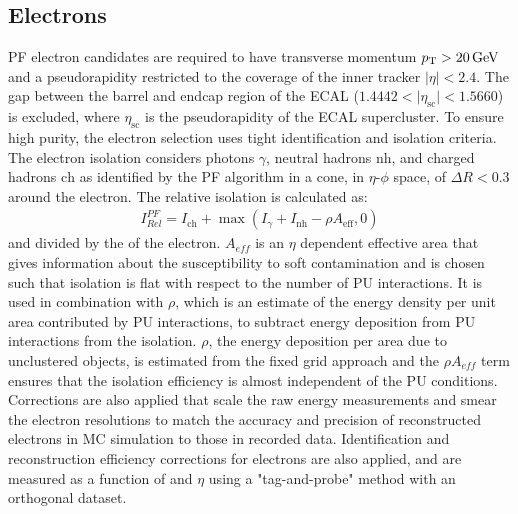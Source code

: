\subsection{Electrons}
PF electron candidates are required to have transverse momentum $\pT > \SI{20}{\GeV}$ and a pseudorapidity restricted to the coverage of the inner tracker $\vert \eta \vert < 2.4$.
The gap between the barrel and endcap region of the ECAL ($1.4442 < \vert \eta_\mathrm{sc} \vert < 1.5660$) is excluded, where $\eta_\mathrm{sc}$ is the pseudorapidity of the ECAL supercluster.
To ensure high purity, the electron selection uses tight identification and isolation criteria.
The electron isolation considers photons $\gamma$, neutral hadrons $\mathrm{nh}$, and charged hadrons $\mathrm{ch}$ as identified by the PF algorithm in a cone, in $\eta$-$\phi$ space, of $\Delta R < 0.3$ around the electron.
The relative isolation is calculated as: 
\begin{align}
I^{PF}_{Rel} = I_{\mathrm{ch}} + \max(I_\gamma + I_{\mathrm{nh}} - \rho A_{\mathrm{eff}}, 0)
\end{align}
and divided by the \pT of the electron.
$A_{eff}$ is an $\eta$ dependent effective area that gives information about the susceptibility to soft contamination and is chosen such that isolation is flat with respect to the number of PU interactions. 
It is used in combination with $\rho$, which is an estimate of the energy density per unit area contributed by PU interactions, to subtract energy deposition from PU interactions from the isolation.
$\rho$, the energy deposition per area due to unclustered objects, is estimated from the fixed grid approach and the $\rho A_{eff}$ term ensures that the isolation efficiency is almost independent of the PU conditions.
Corrections are also applied that scale the raw energy measurements and smear the electron resolutions to match the accuracy and precision of reconstructed electrons in MC simulation to those in recorded data.
Identification and reconstruction efficiency corrections for electrons are also applied, and are measured as a function of \pT and $\eta$ using a "tag-and-probe" method with an orthogonal dataset.


